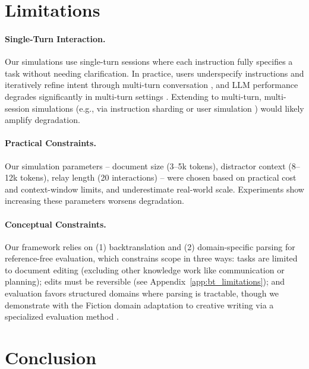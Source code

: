 \documentclass{article} %
\begin{document}
\section{Limitations} \label{sec:limitations}

\vspace{-0.5\intextsep}
\paragraph{Single-Turn Interaction.} Our simulations use single-turn sessions where each instruction fully specifies a task without needing clarification. In practice, users underspecify instructions and iteratively refine intent through multi-turn conversation \citep{Herlihy2024OnOM,kim2026discoverllm}, and LLM performance degrades significantly in multi-turn settings \citep{Laban2025LLMsGL}. Extending \benchmark{} to multi-turn, multi-session simulations (e.g., via instruction sharding or user simulation \citep{naous2025flipping}) would likely amplify degradation.

\vspace{-0.5\intextsep}
\paragraph{Practical Constraints.} Our simulation parameters -- document size (3--5k tokens), distractor context (8--12k tokens), relay length (20 interactions) -- were chosen based on practical cost and context-window limits, and underestimate real-world scale. Experiments show increasing these parameters worsens degradation.

\vspace{-0.5\intextsep}
\paragraph{Conceptual Constraints.} Our framework relies on (1) backtranslation and (2) domain-specific parsing for reference-free evaluation, which constrains scope in three ways: tasks are limited to document editing (excluding other knowledge work like communication or planning); edits must be reversible (see Appendix~\ref{app:bt_limitations}); and evaluation favors structured domains where parsing is tractable, though we demonstrate with the Fiction domain adaptation to creative writing via a specialized evaluation method \citep{Chakrabarty2025AISlopTA}.

\section{Conclusion} \label{sec:conclusion}
\end{document}
